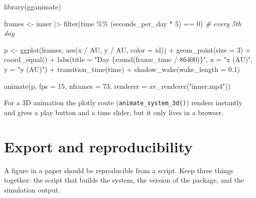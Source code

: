 \documentclass[
  10.5pt,
  letterpaper,
]{scrbook}
\newenvironment{Shaded}{\begin{snugshade}}{\end{snugshade}}
\newcommand{\AttributeTok}[1]{\textcolor[rgb]{0.00,0.00,0.00}{#1}}
\newcommand{\CommentTok}[1]{\textcolor[rgb]{0.00,0.00,0.00}{\textit{#1}}}
\newcommand{\DecValTok}[1]{\textcolor[rgb]{0.00,0.00,0.00}{#1}}
\newcommand{\FloatTok}[1]{\textcolor[rgb]{0.00,0.00,0.00}{#1}}
\newcommand{\FunctionTok}[1]{\textcolor[rgb]{0.00,0.00,0.00}{#1}}
\newcommand{\NormalTok}[1]{\textcolor[rgb]{0.00,0.00,0.00}{#1}}
\newcommand{\OtherTok}[1]{\textcolor[rgb]{0.00,0.00,0.00}{#1}}
\newcommand{\SpecialCharTok}[1]{\textcolor[rgb]{0.00,0.00,0.00}{#1}}
\newcommand{\StringTok}[1]{\textcolor[rgb]{0.00,0.00,0.00}{#1}}
\theoremstyle{plain}
\theoremstyle{remark}
\begin{document}
\begin{Shaded}
\begin{Highlighting}[]
\FunctionTok{library}\NormalTok{(gganimate)}

\NormalTok{frames }\OtherTok{\textless{}{-}}\NormalTok{ inner }\SpecialCharTok{|\textgreater{}} \FunctionTok{filter}\NormalTok{(time }\SpecialCharTok{\%\%}\NormalTok{ (seconds\_per\_day }\SpecialCharTok{*} \DecValTok{5}\NormalTok{) }\SpecialCharTok{==} \DecValTok{0}\NormalTok{)   }\CommentTok{\# every 5th day}

\NormalTok{p }\OtherTok{\textless{}{-}} \FunctionTok{ggplot}\NormalTok{(frames, }\FunctionTok{aes}\NormalTok{(x }\SpecialCharTok{/}\NormalTok{ AU, y }\SpecialCharTok{/}\NormalTok{ AU, }\AttributeTok{color =}\NormalTok{ id)) }\SpecialCharTok{+}
  \FunctionTok{geom\_point}\NormalTok{(}\AttributeTok{size =} \DecValTok{3}\NormalTok{) }\SpecialCharTok{+}
  \FunctionTok{coord\_equal}\NormalTok{() }\SpecialCharTok{+}
  \FunctionTok{labs}\NormalTok{(}\AttributeTok{title =} \StringTok{"Day \{round(frame\_time / 86400)\}"}\NormalTok{, }\AttributeTok{x =} \StringTok{"x (AU)"}\NormalTok{, }\AttributeTok{y =} \StringTok{"y (AU)"}\NormalTok{) }\SpecialCharTok{+}
  \FunctionTok{transition\_time}\NormalTok{(time) }\SpecialCharTok{+}
  \FunctionTok{shadow\_wake}\NormalTok{(}\AttributeTok{wake\_length =} \FloatTok{0.1}\NormalTok{)}

\FunctionTok{animate}\NormalTok{(p, }\AttributeTok{fps =} \DecValTok{15}\NormalTok{, }\AttributeTok{nframes =} \DecValTok{73}\NormalTok{, }\AttributeTok{renderer =} \FunctionTok{av\_renderer}\NormalTok{(}\StringTok{"inner.mp4"}\NormalTok{))}
\end{Highlighting}
\end{Shaded}

For a 3D animation the plotly route (\texttt{animate\_system\_3d()})
renders instantly and gives a play button and a time slider, but it only
lives in a browser.

\section{Export and reproducibility}\label{export-and-reproducibility}

A figure in a paper should be reproducible from a script. Keep three
things together: the script that builds the system, the version of the
package, and the simulation output.
\end{document}
